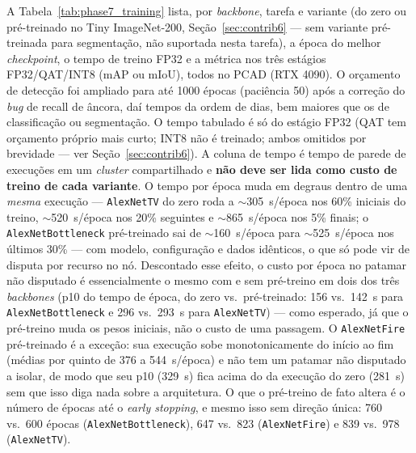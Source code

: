 \documentclass[conference]{IEEEtran}
\begin{document}
A Tabela~\ref{tab:phase7_training} lista, por \textit{backbone}, tarefa e variante (do zero ou
pré-treinado no Tiny ImageNet-200, Seção~\ref{sec:contrib6} — sem variante pré-treinada para
segmentação, não suportada nesta tarefa), a época do melhor \textit{checkpoint}, o
tempo de treino FP32 e a métrica nos três estágios FP32/QAT/INT8 (mAP ou mIoU), todos no PCAD (RTX
4090). O orçamento de detecção foi ampliado para até 1000 épocas (paciência
50) após a correção do \textit{bug} de recall de âncora,
daí tempos da ordem de dias, bem maiores que os de classificação ou segmentação. O tempo tabulado é
só do estágio FP32 (QAT tem orçamento próprio mais curto; INT8 não é treinado; ambos omitidos por
brevidade — ver Seção~\ref{sec:contrib6}). A coluna de tempo é tempo de parede de execuções em um \textit{cluster}
compartilhado e \textbf{não deve ser lida como custo de treino de cada variante}. O tempo por época
muda em degraus dentro de uma \emph{mesma} execução --- \texttt{AlexNetTV} do zero roda a
$\sim$305~s/época nos 60\% iniciais do treino, $\sim$520~s/época nos 20\% seguintes e $\sim$865~s/época
nos 5\% finais; o \texttt{AlexNetBottleneck} pré-treinado sai de $\sim$160~s/época para
$\sim$525~s/época nos últimos
30\% --- com modelo, configuração e dados idênticos, o que só pode vir de disputa por recurso no nó.
Descontado esse efeito, o custo por época no patamar não disputado é essencialmente o mesmo com e
sem pré-treino em dois dos três \textit{backbones}
(p10 do tempo de época, do zero vs.\ pré-treinado: 156 vs.\ 142~s para \texttt{AlexNetBottleneck} e
296 vs.\ 293~s para \texttt{AlexNetTV}) --- como esperado, já que
o pré-treino muda os pesos iniciais, não o custo de uma passagem. O \texttt{AlexNetFire}
pré-treinado é a exceção: sua execução sobe monotonicamente do início ao fim (médias por quinto de
376 a 544~s/época) e não tem um patamar não disputado a isolar, de modo que seu p10 (329~s) fica
acima do da execução do zero (281~s) sem que isso diga nada sobre a arquitetura. O que o pré-treino de fato altera
é o número de épocas até o \textit{early stopping}, e mesmo isso sem direção única: 760 vs.\ 600
épocas (\texttt{AlexNetBottleneck}), 647 vs.\ 823 (\texttt{AlexNetFire}) e 839 vs.\ 978
(\texttt{AlexNetTV}).
\end{document}
